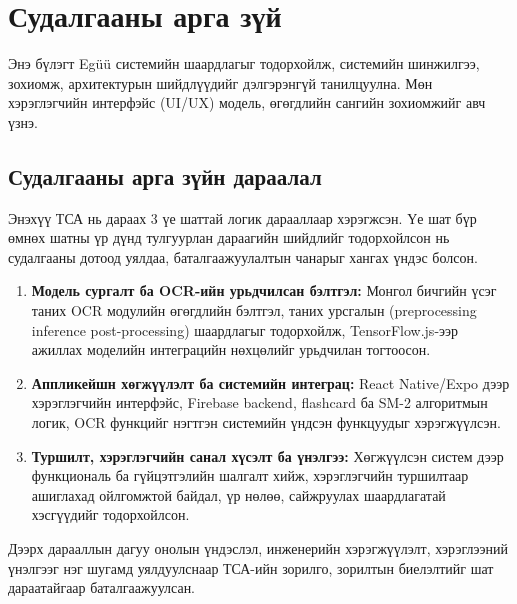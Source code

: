 
\section{Судалгааны арга зүй}
\label{sec:methodology}

Энэ бүлэгт Egüü системийн шаардлагыг тодорхойлж, системийн шинжилгээ, зохиомж, архитектурын шийдлүүдийг дэлгэрэнгүй танилцуулна. Мөн хэрэглэгчийн интерфэйс (UI/UX) модель, өгөгдлийн сангийн зохиомжийг авч үзнэ.

\subsection{Судалгааны арга зүйн дараалал}
\label{subsec:method-sequence}

Энэхүү ТСА нь дараах 3 үе шаттай логик дарааллаар хэрэгжсэн. Үе шат бүр өмнөх шатны үр дүнд тулгуурлан дараагийн шийдлийг тодорхойлсон нь судалгааны дотоод уялдаа, баталгаажуулалтын чанарыг хангах үндэс болсон.

\begin{enumerate}
    \item \textbf{Модель сургалт ба OCR-ийн урьдчилсан бэлтгэл:} Монгол бичгийн үсэг таних OCR модулийн өгөгдлийн бэлтгэл, таних урсгалын (preprocessing \textrightarrow{} inference \textrightarrow{} post-processing) шаардлагыг тодорхойлж, TensorFlow.js-ээр ажиллах моделийн интеграцийн нөхцөлийг урьдчилан тогтоосон.

    \item \textbf{Аппликейшн хөгжүүлэлт ба системийн интеграц:} React Native/Expo дээр хэрэглэгчийн интерфэйс, Firebase backend, flashcard ба SM-2 алгоритмын логик, OCR функцийг нэгтгэн системийн үндсэн функцуудыг хэрэгжүүлсэн.

    \item \textbf{Туршилт, хэрэглэгчийн санал хүсэлт ба үнэлгээ:} Хөгжүүлсэн систем дээр функциональ ба гүйцэтгэлийн шалгалт хийж, хэрэглэгчийн туршилтаар ашиглахад ойлгомжтой байдал, үр нөлөө, сайжруулах шаардлагатай хэсгүүдийг тодорхойлсон.
\end{enumerate}

Дээрх дарааллын дагуу онолын үндэслэл, инженерийн хэрэгжүүлэлт, хэрэглээний үнэлгээг нэг шугамд уялдуулснаар ТСА-ийн зорилго, зорилтын биелэлтийг шат дараатайгаар баталгаажуулсан.

